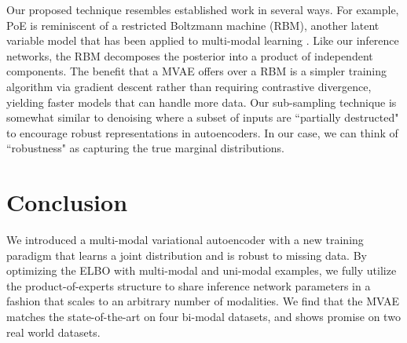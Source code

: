 Our proposed technique resembles established work in several ways. For example, PoE is reminiscent of a restricted Boltzmann machine (RBM), another latent variable model that has been applied to multi-modal learning \cite{ngiam2011multimodal, srivastava2012multimodal}. Like our inference networks, the RBM decomposes the posterior into a product of independent components. The benefit that a MVAE offers over a RBM is a simpler training algorithm via gradient descent rather than requiring contrastive divergence, yielding faster models that can handle more data. Our sub-sampling technique is somewhat similar to denoising \cite{vincent2008extracting, ngiam2011multimodal} where a subset of inputs are ``partially destructed" to encourage robust representations in autoencoders. In our case, we can think of ``robustness" as capturing the true marginal distributions.

\section{Conclusion}
We introduced a multi-modal variational autoencoder with a new training paradigm that learns a joint distribution and is robust to missing data. By optimizing the ELBO with multi-modal and uni-modal examples, we fully utilize the product-of-experts structure to share inference network parameters in a fashion that scales to an arbitrary number of modalities. We find that the MVAE matches the state-of-the-art on four bi-modal datasets, and shows promise on two real world datasets.